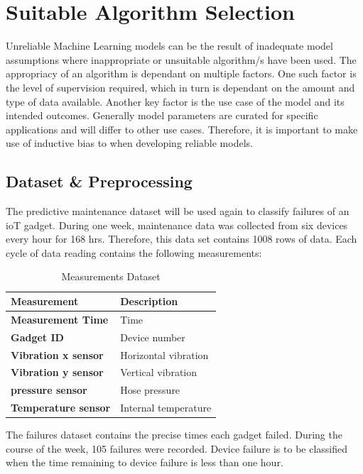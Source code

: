 \documentclass[a4paper,12pt]{report}
\begin{document}
\chapter{Suitable Algorithm Selection}
Unreliable Machine Learning models can be the result of inadequate model assumptions where inappropriate or unsuitable algorithm/s have been used.
The appropriacy of an algorithm is dependant on multiple factors. One such factor is the level of supervision required, which in turn is dependant on the amount and type of data available.
Another key factor is the use case of the model and its intended outcomes. Generally model parameters are curated for specific applications and will differ to other use cases.
Therefore, it is important to make use of inductive bias\cite{saria2019tutorial} to when developing reliable models.

\section{Dataset \& Preprocessing}
The predictive maintenance dataset will be used again to classify failures of an ioT gadget.
During one week, maintenance data was collected from six devices every hour for 168 hrs.
Therefore, this data set contains 1008 rows of data. 
Each cycle of data reading contains the following measurements: 

\begin{table}[ht]
    \begin{center}
        \caption{Measurements Dataset} 
        \begin{tabular}{ l|l } 
         \toprule
         \textbf{Measurement} & \textbf{Description} \\  [0.5ex] 
         \midrule
         \textbf{Measurement Time} & Time \\
         \textbf{Gadget ID} & Device number \\
         \textbf{Vibration x sensor} & Horizontal vibration \\ 
         \textbf{Vibration y sensor} & Vertical vibration \\ 
         \textbf{pressure sensor} & Hose pressure \\
         \textbf{Temperature sensor} & Internal temperature \\
         \bottomrule
        \end{tabular}
    \end{center}
\end{table}

The failures dataset contains the precise times each gadget failed. 
During the course of the week, 105 failures were recorded.
Device failure is to be classified when the time remaining to device failure is less than one hour.
\end{document}
